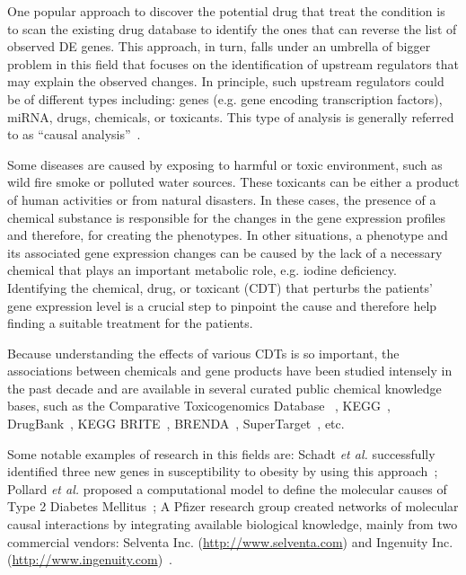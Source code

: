 One popular approach to discover the potential drug that treat the condition is to scan the existing drug database to identify the ones that can reverse the list of observed DE genes.  
This approach, in turn, falls under an umbrella of bigger problem in this field that focuses on the identification of upstream regulators that may explain the observed changes. In principle, such upstream regulators could be of different types including: genes (e.g. gene encoding transcription factors), miRNA, drugs, chemicals, or toxicants. This type of analysis is generally referred to as ``causal analysis''~\cite{schadt:2005, chindelevitch2012causal, kramer2013causal, felciano2013predictive}. 

Some diseases are caused by exposing to harmful or toxic environment, such as wild fire smoke or polluted water sources. These toxicants can be either a product of human activities or from natural disasters. In these cases, the presence of a chemical substance  is responsible for the changes in  the gene expression profiles and  therefore, for creating the phenotypes. 
In other situations,  a phenotype and its associated  gene expression changes  can be caused by the lack of a necessary chemical  that plays an important metabolic role, e.g. iodine deficiency. 
Identifying the chemical, drug, or toxicant (CDT) that perturbs the patients' gene expression level is a crucial step to pinpoint the cause and therefore help finding a suitable treatment for the patients.


Because understanding the effects of various CDTs is so important, the associations between chemicals and gene products have been studied intensely in the past decade and are available in several curated public chemical knowledge bases, such as the Comparative Toxicogenomics Database ~\cite{mattingly2006comparative}, KEGG~\cite{Kanehisa:2000},  DrugBank~\cite{law2014drugbank}, KEGG BRITE~\cite{kanehisa2006genomics}, BRENDA~\cite{schomburg2004brenda}, SuperTarget~\cite{gunther2007supertarget}, etc. 


Some notable examples of research in this fields are: Schadt \emph{et al.} successfully identified three new genes in susceptibility to obesity by using this approach~\cite{schadt:2005};
Pollard \emph{et al.} proposed a computational model to define the molecular causes of Type 2 Diabetes Mellitus~\cite{pollard2005computational};  A Pfizer research group created networks of molecular causal interactions by integrating available biological knowledge, mainly from two commercial vendors: Selventa Inc. (\href{http://www.selventa.com}{http://www.selventa.com}) and Ingenuity Inc. (\href{http://www.ingenuity.com}{http://www.ingenuity.com})~\cite{chindelevitch2012causal}.


